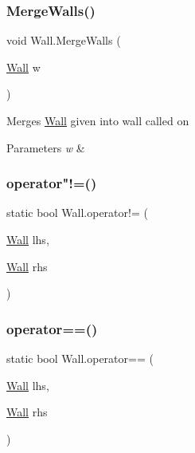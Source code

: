 \mbox{\label{class_wall_a8104353e14b558c07aaef0a26f246418}} 
\subsubsection{\texorpdfstring{Merge\+Walls()}{MergeWalls()}}
{\footnotesize\ttfamily void Wall.\+Merge\+Walls (\begin{DoxyParamCaption}\item[{\mbox{\hyperlink{class_wall}{Wall}}}]{w }\end{DoxyParamCaption})}



Merges \mbox{\hyperlink{class_wall}{Wall}} given into wall called on 


\begin{DoxyParams}{Parameters}
{\em w} & \\
\hline
\end{DoxyParams}
\mbox{\label{class_wall_a12a6667a52ef86d8678ecb3cd21972e2}} 
\subsubsection{\texorpdfstring{operator"!=()}{operator!=()}}
{\footnotesize\ttfamily static bool Wall.\+operator!= (\begin{DoxyParamCaption}\item[{\mbox{\hyperlink{class_wall}{Wall}}}]{lhs,  }\item[{\mbox{\hyperlink{class_wall}{Wall}}}]{rhs }\end{DoxyParamCaption})\hspace{0.3cm}{\ttfamily [static]}}

\mbox{\label{class_wall_a0eaebc195033f236c71d8c812b6a0256}} 
\subsubsection{\texorpdfstring{operator==()}{operator==()}}
{\footnotesize\ttfamily static bool Wall.\+operator== (\begin{DoxyParamCaption}\item[{\mbox{\hyperlink{class_wall}{Wall}}}]{lhs,  }\item[{\mbox{\hyperlink{class_wall}{Wall}}}]{rhs }\end{DoxyParamCaption})\hspace{0.3cm}{\ttfamily [static]}}



